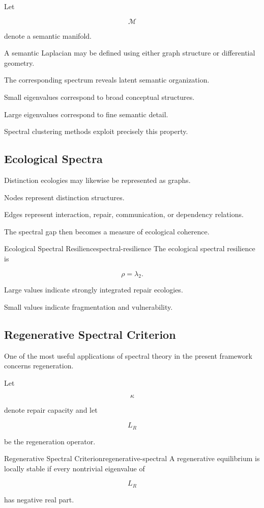 \documentclass[12pt,twoside,openright]{book}
\begin{document}
Let

\[
\mathcal M
\]

denote a semantic manifold.

A semantic Laplacian may be defined using either graph
structure or differential geometry.

The corresponding spectrum reveals latent semantic
organization.

Small eigenvalues correspond to broad conceptual
structures.

Large eigenvalues correspond to fine semantic detail.

Spectral clustering methods exploit precisely this
property.

\subsection{Ecological Spectra}

Distinction ecologies may likewise be represented as
graphs.

Nodes represent distinction structures.

Edges represent interaction, repair, communication, or
dependency relations.

The spectral gap then becomes a measure of ecological
coherence.

\begin{definition}{Ecological Spectral Resilience}{spectral-resilience}
The ecological spectral resilience is

\[
\rho
=

\lambda_2.
\]
\end{definition}

Large values indicate strongly integrated repair
ecologies.

Small values indicate fragmentation and vulnerability.

\subsection{Regenerative Spectral Criterion}

One of the most useful applications of spectral theory in
the present framework concerns regeneration.

Let

\[
\kappa
\]

denote repair capacity and let

\[
L_R
\]

be the regeneration operator.

\begin{theorem}{Regenerative Spectral Criterion}{regenerative-spectral}
A regenerative equilibrium is locally stable if every
nontrivial eigenvalue of

\[
L_R
\]

has negative real part.
\end{theorem}
\end{document}
